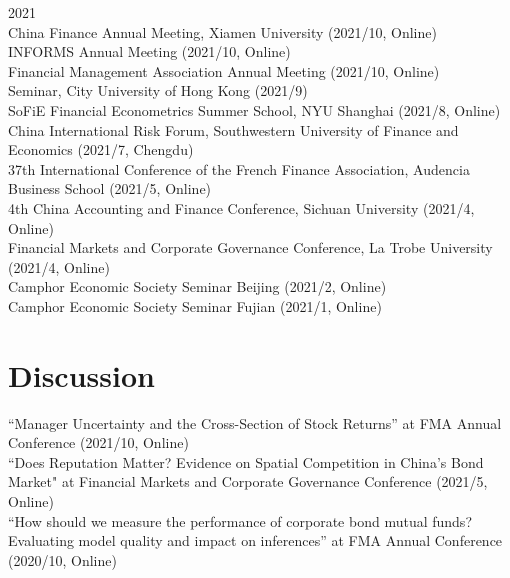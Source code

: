 \documentclass[margin]{res}
\begin{document}
\begin{resume}
		2021 \\
		China Finance Annual Meeting, Xiamen University (2021/10, Online) \\
		INFORMS Annual Meeting (2021/10, Online) \\
		Financial Management Association Annual Meeting (2021/10, Online) \\
		Seminar, City University of Hong Kong (2021/9) \\
		SoFiE Financial Econometrics Summer School, NYU Shanghai (2021/8, Online) \\
		China International Risk Forum, Southwestern University of Finance and Economics  (2021/7, Chengdu) \\
		37th International Conference of the French Finance Association, Audencia Business School (2021/5, Online) \\
		4th China Accounting and Finance Conference, Sichuan University (2021/4, Online) \\
		Financial Markets and Corporate Governance Conference, La Trobe University (2021/4, Online) \\
		Camphor Economic Society Seminar Beijing (2021/2, Online) \\
		Camphor Economic Society Seminar Fujian (2021/1, Online)\\
		
		
		\section{\sc Discussion}
		
		``Manager Uncertainty and the Cross-Section of Stock Returns'' at FMA Annual Conference (2021/10, Online)
		\\
		``Does Reputation Matter? Evidence on Spatial Competition in China’s Bond Market" at Financial Markets and Corporate Governance Conference (2021/5, Online)
		\\
		``How should we measure the performance of corporate bond mutual funds? Evaluating model quality and impact on inferences'' at FMA Annual Conference (2020/10, Online)
		\\
		
		

\end{resume}
\end{document}
